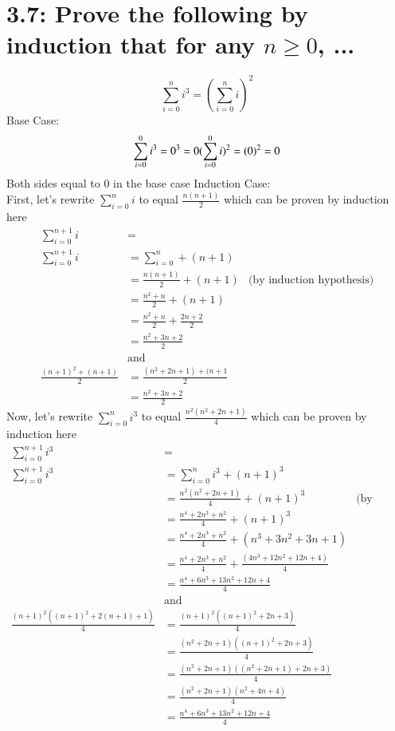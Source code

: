 \documentclass{article}
\begin{document}
\section*{3.7: Prove the following by induction that for any $n \geq 0$, ...}
\begin{equation}
  \sum_{i=0}^n i^3 = (\sum_{i=0}^n i)^2
\end{equation}
Base Case:
\begin{equation}
  \sum_{i=0}^0 i^3 = 0^3 = 0 \\
  (\sum_{i=0}^0 i)^2 = (0)^2 = 0 
\end{equation}
Both sides equal to 0 in the base case
Induction Case: \\
First, let's rewrite $\sum_{i=0}^n i$ to equal $\frac{n(n+1)}{2}$ which can be proven by induction here
\begin{align*}
  \sum_{i=0}^{n+1} i &= \\
  \sum_{i=0}^{n+1} i &= \sum_{i=0}^{n} + (n+1) \\
   &= \frac{n(n+1)}{2} + (n+1) &\textrm{(by induction hypothesis)} \\
  &= \frac{n^2+n}{2} + (n+1) \\
   &= \frac{n^2+n}{2} + \frac{2n+2}{2} \\
   &= \frac{n^2+3n+2}{2} \\
  &\textrm{and} \\
  \frac{(n+1)^2+(n+1)}{2} &= \frac{(n^2+2n+1) + (n+1}{2} \\
  &= \frac{n^2+3n+2}{2}
\end{align*}
Now, let's rewrite $\sum_{i=0}^n i^3$ to equal $\frac{n^2(n^2+2n+1)}{4}$ which can be proven by induction here
\begin{align*}
  \sum_{i=0}^{n+1} i^3 &= \\
  \sum_{i=0}^{n+1} i^3 &= \sum_{i=0}^{n} i^3 + (n+1)^3 \\
  &= \frac{n^2(n^2+2n+1)}{4} + (n+1)^3 &\textrm{(by induction hypothesis)} \\
  &= \frac{n^4+2n^3+n^2}{4} + (n+1)^3 \\
  &= \frac{n^4+2n^3+n^2}{4} + (n^3+3n^2+3n+1) \\
  &= \frac{n^4+2n^3+n^2}{4} + \frac{(4n^3+12n^2+12n+4)}{4} \\
  &= \frac{n^4+6n^3+13n^2+12n+4}{4} \\
  &\textrm{and} \\
  \frac{(n+1)^2((n+1)^2+2(n+1)+1)}{4} &= \frac{(n+1)^2((n+1)^2+2n+3)}{4} \\
  &= \frac{(n^2+2n+1)((n+1)^2+2n+3)}{4} \\
  &= \frac{(n^2+2n+1)((n^2+2n+1)+2n+3)}{4} \\
  &= \frac{(n^2+2n+1)(n^2+4n+4)}{4} \\
  &= \frac{n^4+6n^3+13n^2+12n+4}{4}
\end{align*}
\end{document}
